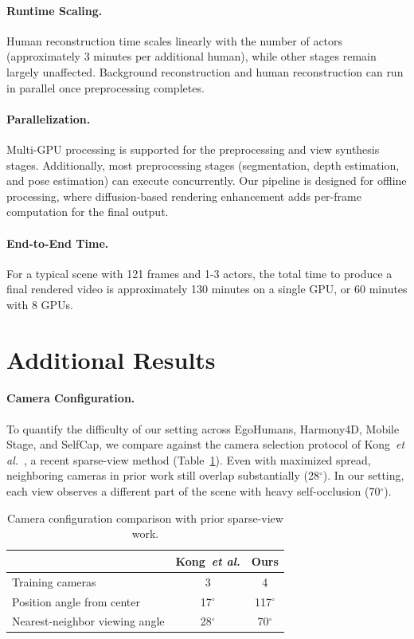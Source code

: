 \documentclass[acmtog]{acmart}
\newcommand{\degree}{$^\circ$}
\begin{document}
\paragraph{Runtime Scaling.}
Human reconstruction time scales linearly with the number of actors (approximately 3 minutes per additional human), while other stages remain largely unaffected. Background reconstruction and human reconstruction can run in parallel once preprocessing completes.

\paragraph{Parallelization.}
Multi-GPU processing is supported for the preprocessing and view synthesis stages. Additionally, most preprocessing stages (segmentation, depth estimation, and pose estimation) can execute concurrently. Our pipeline is designed for offline processing, where diffusion-based rendering enhancement adds per-frame computation for the final output.

\paragraph{End-to-End Time.}
For a typical scene with 121 frames and 1-3 actors, the total time to produce a final rendered video is approximately 130 minutes on a single GPU, or 60 minutes with 8 GPUs.

\section{Additional Results}
\label{sec:appendix_results}

\paragraph{Camera Configuration.}
To quantify the difficulty of our setting across EgoHumans, Harmony4D, Mobile Stage, and SelfCap, we compare against the camera selection protocol of Kong~\textit{et al.}~\cite{kong2025generative}, a recent sparse-view method (Table~\ref{tab:camera_overlap}). Even with maximized spread, neighboring cameras in prior work still overlap substantially (28\degree). In our setting, each view observes a different part of the scene with heavy self-occlusion (70\degree).

\begin{table}[tbp]
\centering
\caption{Camera configuration comparison with prior sparse-view work.}
\label{tab:camera_overlap}
\begin{tabular}{l|cc}
\toprule
& Kong~\textit{et al.} & Ours \\
\midrule
Training cameras & 3 & 4 \\
Position angle from center & 17\degree & 117\degree \\
Nearest-neighbor viewing angle & 28\degree & 70\degree \\
\bottomrule
\end{tabular}
\end{table}
\end{document}
